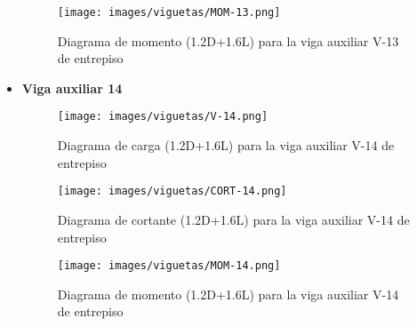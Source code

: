 \begin{itemize}
            \begin{figure}[H]
                \centering
                \texttt{[image: images/viguetas/MOM-13.png]}
                \caption{Diagrama de momento (1.2D+1.6L) para la viga auxiliar V-13 de entrepiso}
                \label{fig:Mom V-13 EP}
            \end{figure}
            
            \item \textbf{Viga auxiliar 14}\\
            \begin{figure}[H]
                \centering
                \texttt{[image: images/viguetas/V-14.png]}
                \caption{Diagrama de carga (1.2D+1.6L) para la viga auxiliar V-14 de entrepiso}
                \label{fig:W V-14 EP}
            \end{figure}
            
            \begin{figure}[H]
                \centering
                \texttt{[image: images/viguetas/CORT-14.png]}
                \caption{Diagrama de cortante (1.2D+1.6L) para la viga auxiliar V-14 de entrepiso}
                \label{fig:Cort V-14 EP}
            \end{figure}
            
            \begin{figure}[H]
                \centering
                \texttt{[image: images/viguetas/MOM-14.png]}
                \caption{Diagrama de momento (1.2D+1.6L) para la viga auxiliar V-14 de entrepiso}
                \label{fig:Mom V-14 EP}
            \end{figure}
            
\end{itemize}




